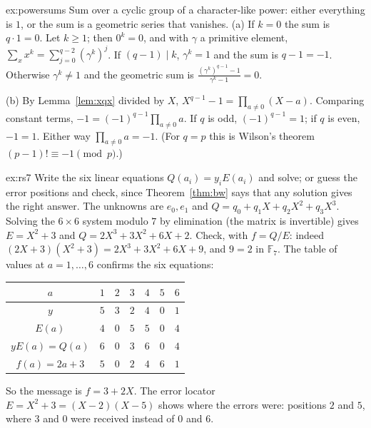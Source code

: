 \begin{solution}{ex:powersums}
\idea Sum over a cyclic group of a character-like power: either everything is $1$, or the sum is a geometric series that vanishes.
\writeup (a) If $k=0$ the sum is $q\cdot1=0$. Let $k\ge1$; then $0^k=0$, and with $\gamma$ a primitive element, $\sum_{x}x^k=\sum_{j=0}^{q-2}(\gamma^k)^j$. If $(q-1)\mid k$, $\gamma^k=1$ and the sum is $q-1=-1$. Otherwise $\gamma^k\ne1$ and the geometric sum is $\frac{(\gamma^k)^{q-1}-1}{\gamma^k-1}=0$.

(b) By Lemma~\ref{lem:xqx} divided by $X$, $X^{q-1}-1=\prod_{a\ne0}(X-a)$. Comparing constant terms, $-1=(-1)^{q-1}\prod_{a\ne0}a$. If $q$ is odd, $(-1)^{q-1}=1$; if $q$ is even, $-1=1$. Either way $\prod_{a\ne0}a=-1$. (For $q=p$ this is Wilson's theorem $(p-1)!\equiv-1\pmod p$.)
\end{solution}

\begin{solution}{ex:rs7}
\idea Write the six linear equations $Q(a_i)=y_iE(a_i)$ and solve; or guess the error positions and check, since Theorem~\ref{thm:bw} says that any solution gives the right answer.
\writeup The unknowns are $e_0,e_1$ and $Q=q_0+q_1X+q_2X^2+q_3X^3$. Solving the $6\times6$ system modulo $7$ by elimination (the matrix is invertible) gives $E=X^2+3$ and $Q=2X^3+3X^2+6X+2$. Check, with $f=Q/E$: indeed $(2X+3)(X^2+3)=2X^3+3X^2+6X+9$, and $9=2$ in $\mathbb F_7$. The table of values at $a=1,\dots,6$ confirms the six equations:
\begin{center}
\small
\begin{tabular}{c|cccccc}
$a$ & $1$ & $2$ & $3$ & $4$ & $5$ & $6$\\\hline
$y$ & $5$ & $3$ & $2$ & $4$ & $0$ & $1$\\
$E(a)$ & $4$ & $0$ & $5$ & $5$ & $0$ & $4$\\
$yE(a)=Q(a)$ & $6$ & $0$ & $3$ & $6$ & $0$ & $4$\\
$f(a)=2a+3$ & $5$ & $0$ & $2$ & $4$ & $6$ & $1$
\end{tabular}
\end{center}
So the message is $f=3+2X$. The error locator $E=X^2+3=(X-2)(X-5)$ shows where the errors were: positions $2$ and $5$, where $3$ and $0$ were received instead of $0$ and $6$.
\end{solution}

